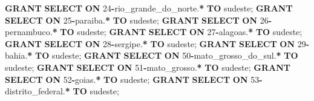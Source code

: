 \documentclass[
]{book}
\newenvironment{Shaded}{\begin{snugshade}}{\end{snugshade}}
\newcommand{\DecValTok}[1]{\textcolor[rgb]{0.00,0.00,0.81}{#1}}
\newcommand{\KeywordTok}[1]{\textcolor[rgb]{0.13,0.29,0.53}{\textbf{#1}}}
\newcommand{\NormalTok}[1]{#1}
\newcommand{\OperatorTok}[1]{\textcolor[rgb]{0.81,0.36,0.00}{\textbf{#1}}}
\newcommand{\StringTok}[1]{\textcolor[rgb]{0.31,0.60,0.02}{#1}}
\begin{document}
\begin{Shaded}
\begin{Highlighting}[]
\KeywordTok{GRANT} \KeywordTok{SELECT} \KeywordTok{ON}\NormalTok{ \textasciigrave{}}\DecValTok{24}\OperatorTok{{-}}\NormalTok{rio\_grande\_do\_norte\textasciigrave{}.}\OperatorTok{*} \KeywordTok{TO} \StringTok{\textquotesingle{}sudeste\textquotesingle{}}\NormalTok{;}
\KeywordTok{GRANT} \KeywordTok{SELECT} \KeywordTok{ON}\NormalTok{ \textasciigrave{}}\DecValTok{25}\OperatorTok{{-}}\NormalTok{paraiba\textasciigrave{}.}\OperatorTok{*}            \KeywordTok{TO} \StringTok{\textquotesingle{}sudeste\textquotesingle{}}\NormalTok{;}
\KeywordTok{GRANT} \KeywordTok{SELECT} \KeywordTok{ON}\NormalTok{ \textasciigrave{}}\DecValTok{26}\OperatorTok{{-}}\NormalTok{pernambuco\textasciigrave{}.}\OperatorTok{*}         \KeywordTok{TO} \StringTok{\textquotesingle{}sudeste\textquotesingle{}}\NormalTok{;}
\KeywordTok{GRANT} \KeywordTok{SELECT} \KeywordTok{ON}\NormalTok{ \textasciigrave{}}\DecValTok{27}\OperatorTok{{-}}\NormalTok{alagoas\textasciigrave{}.}\OperatorTok{*}            \KeywordTok{TO} \StringTok{\textquotesingle{}sudeste\textquotesingle{}}\NormalTok{;}
\KeywordTok{GRANT} \KeywordTok{SELECT} \KeywordTok{ON}\NormalTok{ \textasciigrave{}}\DecValTok{28}\OperatorTok{{-}}\NormalTok{sergipe\textasciigrave{}.}\OperatorTok{*}            \KeywordTok{TO} \StringTok{\textquotesingle{}sudeste\textquotesingle{}}\NormalTok{;}
\KeywordTok{GRANT} \KeywordTok{SELECT} \KeywordTok{ON}\NormalTok{ \textasciigrave{}}\DecValTok{29}\OperatorTok{{-}}\NormalTok{bahia\textasciigrave{}.}\OperatorTok{*}              \KeywordTok{TO} \StringTok{\textquotesingle{}sudeste\textquotesingle{}}\NormalTok{;}
\KeywordTok{GRANT} \KeywordTok{SELECT} \KeywordTok{ON}\NormalTok{ \textasciigrave{}}\DecValTok{50}\OperatorTok{{-}}\NormalTok{mato\_grosso\_do\_sul\textasciigrave{}.}\OperatorTok{*} \KeywordTok{TO} \StringTok{\textquotesingle{}sudeste\textquotesingle{}}\NormalTok{;}
\KeywordTok{GRANT} \KeywordTok{SELECT} \KeywordTok{ON}\NormalTok{ \textasciigrave{}}\DecValTok{51}\OperatorTok{{-}}\NormalTok{mato\_grosso\textasciigrave{}.}\OperatorTok{*}       \KeywordTok{TO} \StringTok{\textquotesingle{}sudeste\textquotesingle{}}\NormalTok{;}
\KeywordTok{GRANT} \KeywordTok{SELECT} \KeywordTok{ON}\NormalTok{ \textasciigrave{}}\DecValTok{52}\OperatorTok{{-}}\NormalTok{goias\textasciigrave{}.}\OperatorTok{*}             \KeywordTok{TO} \StringTok{\textquotesingle{}sudeste\textquotesingle{}}\NormalTok{;}
\KeywordTok{GRANT} \KeywordTok{SELECT} \KeywordTok{ON}\NormalTok{ \textasciigrave{}}\DecValTok{53}\OperatorTok{{-}}\NormalTok{distrito\_federal\textasciigrave{}.}\OperatorTok{*}  \KeywordTok{TO} \StringTok{\textquotesingle{}sudeste\textquotesingle{}}\NormalTok{;}

\end{Highlighting}
\end{Shaded}
\end{document}
